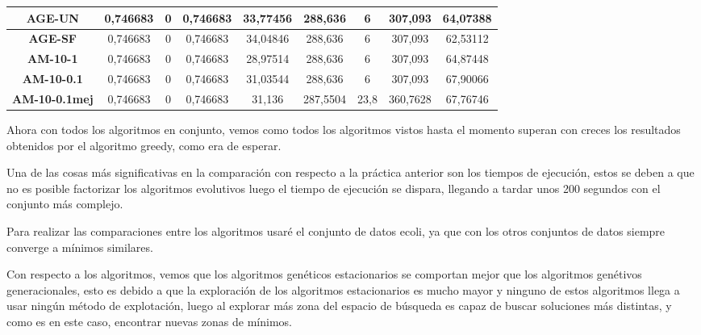 \documentclass[12pt, spanish]{article}
\begin{document}
\begin{table}[H]
\begin{tabular}{|c|c|c|c|c|c|c|c|c|}
\textbf{AGE-UN}       & 0,746683                  & 0                           & 0,746683               & 33,77456   & 288,636                   & 6                           & 307,093                & 64,07388   \\ \hline
\textbf{AGE-SF}       & 0,746683                  & 0                           & 0,746683               & 34,04846   & 288,636                   & 6                           & 307,093                & 62,53112   \\ \hline
\textbf{AM-10-1}      & 0,746683                  & 0                           & 0,746683               & 28,97514   & 288,636                   & 6                           & 307,093                & 64,87448   \\ \hline
\textbf{AM-10-0.1}    & 0,746683                  & 0                           & 0,746683               & 31,03544   & 288,636                   & 6                           & 307,093                & 67,90066   \\ \hline
\textbf{AM-10-0.1mej} & 0,746683                  & 0                           & 0,746683               & 31,136     & 287,5504                  & 23,8                        & 360,7628               & 67,76746   \\ \hline
\end{tabular}
\end{table}


Ahora con todos los algoritmos en conjunto, vemos como todos los algoritmos vistos hasta el momento superan con creces los resultados obtenidos por el algoritmo greedy, como era de esperar.

Una de las cosas más significativas en la comparación con respecto a la práctica anterior son los tiempos de ejecución, estos se deben a que no es posible factorizar los algoritmos evolutivos luego el tiempo de ejecución se dispara, llegando a tardar unos 200 segundos con el conjunto más complejo.

Para realizar las comparaciones entre los algoritmos usaré el conjunto de datos ecoli, ya que con los otros conjuntos de datos siempre converge a mínimos similares.

Con respecto a los algoritmos, vemos que los algoritmos genéticos estacionarios se comportan mejor que los algoritmos genétivos generacionales, esto es debido a que la exploración de los algoritmos estacionarios es mucho mayor y ninguno de estos algoritmos llega a usar ningún método de explotación, luego al explorar más zona del espacio de búsqueda es capaz de buscar soluciones más distintas, y como es en este caso, encontrar nuevas zonas de mínimos.
\end{document}
